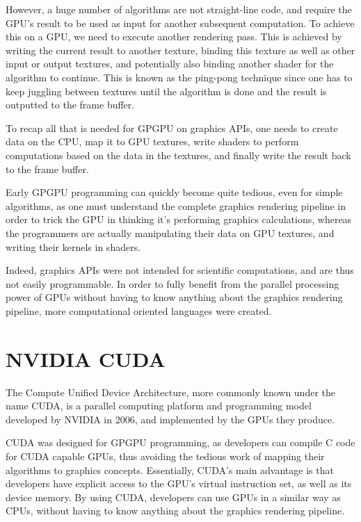 \documentclass[10pt, a4paper]{report}
\begin{document}
\begin{enumerate}
However, a huge number of algorithms are not straight-line code, and require the
GPU's result to be used as input for another subsequent computation.
To achieve this on a GPU, we need to execute another rendering pass.
This is achieved by writing the current result to another texture, binding this
texture as well as other input or output textures, and potentially also binding
another shader for the algorithm to continue.
This is known as the ping-pong technique since one has to keep juggling between
textures until the algorithm is done and the result is outputted to the frame
buffer.

\end{enumerate}

To recap all that is needed for GPGPU on graphics APIs, one needs to create data
on the CPU, map it to GPU textures, write shaders to perform computations based
on the data in the textures, and finally write the result back to the frame
buffer.

Early GPGPU programming can quickly become quite tedious, even for simple
algorithms, as one must understand the complete graphics rendering pipeline in
order to trick the GPU in thinking it's performing graphics calculations,
whereas the programmers are actually manipulating their data on GPU textures,
and writing their kernels in shaders.

Indeed, graphics APIs were not intended for scientific computations, and are
thus not easily programmable.
In order to fully benefit from the parallel processing power of GPUs without
having to know anything about the graphics rendering pipeline, more
computational oriented languages were created.

\section{NVIDIA CUDA}
The Compute Unified Device Architecture, more commonly known under the name
CUDA, is a parallel computing platform and programming model developed by
NVIDIA in 2006, and implemented by the GPUs they produce.

CUDA was designed for GPGPU programming, as developers can compile C code for
CUDA capable GPUs, thus avoiding the tedious work of mapping their algorithms to
graphics concepts.
Essentially, CUDA's main advantage is that developers have explicit access to
the GPU's virtual instruction set, as well as its device memory.
By using CUDA, developers can use GPUs in a similar way as CPUs, without having
to know anything about the graphics rendering pipeline.
\end{document}
